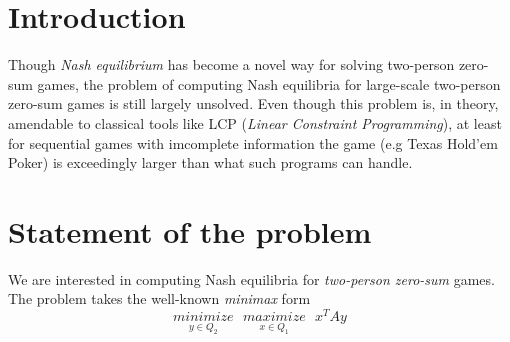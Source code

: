 \documentclass{article} %
\begin{document}
\section{Introduction}
\label{sec:intro}
Though \textit{Nash equilibrium} has become a novel way for solving two-person zero-sum games, the problem of computing Nash equilibria for large-scale two-person zero-sum games is still largely unsolved. Even though this problem is, in theory, amendable to classical tools like LCP (\textit{Linear Constraint Programming}), at least for sequential games with imcomplete information the game (e.g Texas Hold'em Poker) is exceedingly larger than what such programs can handle.

\section{Statement of the problem}
We are interested in computing Nash equilibria for \textit{two-person zero-sum} games. The problem takes the well-known \textit{minimax} form
\begin{equation}
  \underset{y \in Q_2}{minimize}\text{ }\underset{x \in Q_1}{maximize}\text{ }{x^TAy}
  \label{eq:opt_pb}
\end{equation}
\end{document}
